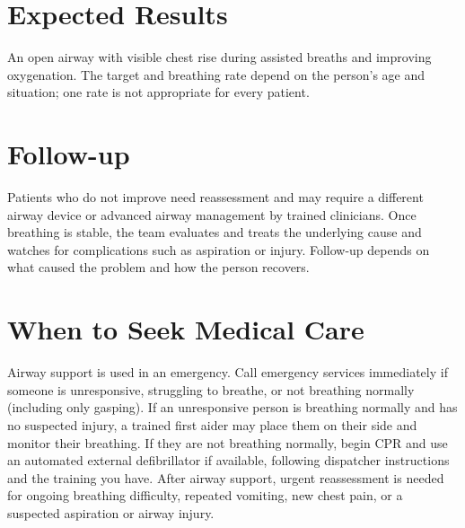 \section*{Expected Results}
An open airway with visible chest rise during assisted breaths and improving oxygenation. The target and breathing rate depend on the person's age and situation; one rate is not appropriate for every patient.
\section*{Follow-up}
Patients who do not improve need reassessment and may require a different airway device or advanced airway management by trained clinicians. Once breathing is stable, the team evaluates and treats the underlying cause and watches for complications such as aspiration or injury. Follow-up depends on what caused the problem and how the person recovers.
\section*{When to Seek Medical Care}
Airway support is used in an emergency. Call emergency services immediately if someone is unresponsive, struggling to breathe, or not breathing normally (including only gasping). If an unresponsive person is breathing normally and has no suspected injury, a trained first aider may place them on their side and monitor their breathing. If they are not breathing normally, begin CPR and use an automated external defibrillator if available, following dispatcher instructions and the training you have. After airway support, urgent reassessment is needed for ongoing breathing difficulty, repeated vomiting, new chest pain, or a suspected aspiration or airway injury.

